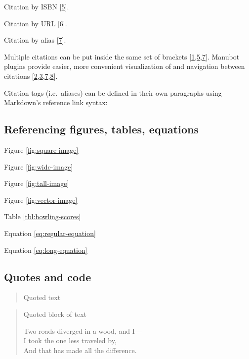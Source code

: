 Citation by ISBN {[}\protect\hyperlink{ref-zBPP9YKu}{5}{]}.

Citation by URL {[}\protect\hyperlink{ref-1GGGHdsew}{6}{]}.

Citation by alias {[}\protect\hyperlink{ref-PZMP42Ak}{7}{]}.

Multiple citations can be put inside the same set of brackets {[}\protect\hyperlink{ref-IhliSZDo}{1},\protect\hyperlink{ref-zBPP9YKu}{5},\protect\hyperlink{ref-PZMP42Ak}{7}{]}.
Manubot plugins provide easier, more convenient visualization of and navigation between citations {[}\protect\hyperlink{ref-mSMVRkoc}{2},\protect\hyperlink{ref-126Wi5Us4}{3},\protect\hyperlink{ref-PZMP42Ak}{7},\protect\hyperlink{ref-YuJbg3zO}{8}{]}.

Citation tags (i.e.~aliases) can be defined in their own paragraphs using Markdown's reference link syntax:

\hypertarget{referencing-figures-tables-equations}{%
\subsection{Referencing figures, tables, equations}\label{referencing-figures-tables-equations}}

Figure \ref{fig:square-image}

Figure \ref{fig:wide-image}

Figure \ref{fig:tall-image}

Figure \ref{fig:vector-image}

Table \ref{tbl:bowling-scores}

Equation \ref{eq:regular-equation}

Equation \ref{eq:long-equation}

\hypertarget{quotes-and-code}{%
\subsection{Quotes and code}\label{quotes-and-code}}

\begin{quote}
Quoted text
\end{quote}

\begin{quote}
Quoted block of text

Two roads diverged in a wood, and I---\\
I took the one less traveled by,\\
And that has made all the difference.
\end{quote}

